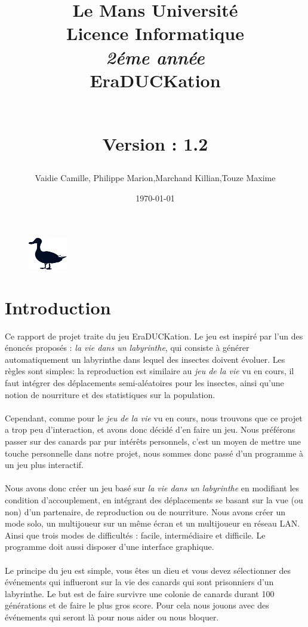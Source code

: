 \documentclass[12pt,a4paper,twoside]{article}
\begin{document}
\title {\textbf {\color {blue} Le Mans Université}\color{black}
\\Licence Informatique  
\\ \textit {2éme année}
\\ \textbf {\color {red}EraDUCKation}
\author{Vaidie Camille, Philippe Marion,Marchand Killian,Touze Maxime}
\\ Version : 1.2 
\date \today }
\maketitle 
\begin {figure}
\begin{center}\includegraphics[width=0.15\textwidth]{images.png} \end{center}
\hspace{100pt}
\end {figure}
\newpage
\tableofcontents
\newpage
\section{Introduction}
    Ce rapport de projet traite du jeu EraDUCKation. Le jeu est inspiré par l'un des énoncés proposés :
 \textit{la vie dans un labyrinthe}, qui consiste à générer automatiquement
 un labyrinthe dans lequel des insectes doivent évoluer. Les règles sont 
simples: la reproduction est similaire au \textit{jeu de la vie} vu en cours, il faut intégrer des déplacements semi-aléatoires pour 
les insectes, ainsi qu'une notion de nourriture et des statistiques sur 
la population.
\\
\\Cependant, comme pour le \textit{jeu de la vie} vu en cours, nous
trouvons que ce projet a trop peu d'interaction, et avons donc décidé 
d'en faire un jeu. Nous préférons passer sur des canards par pur intérêts 
personnels, c'est un moyen de mettre une touche personnelle dans notre projet, 
nous sommes donc passé d’un programme à un jeu plus interactif.
\\
\\Nous avons donc créer un jeu basé sur \textit{la vie dans un labyrinthe} en modifiant les condition d'accouplement, en intégrant des déplacements se basant sur la vue (ou non) d'un partenaire, de reproduction ou de nourriture. Nous avons créer un mode solo, un multijoueur sur un même écran et un multijoueur en réseau LAN. Ainsi que trois modes de difficultés : 
facile, intermédiaire et difficile. Le programme doit aussi disposer d'une interface graphique. \\
\\Le principe du jeu est simple, vous êtes un dieu et vous devez sélectionner des événements qui influeront sur la vie des canards qui sont prisonniers d’un labyrinthe. Le but est de faire survivre une colonie de canards durant 100 générations et de faire le plus gros score. Pour cela nous jouons avec des événements qui seront là pour nous aider ou nous bloquer.\\
\newpage
\end{document}
